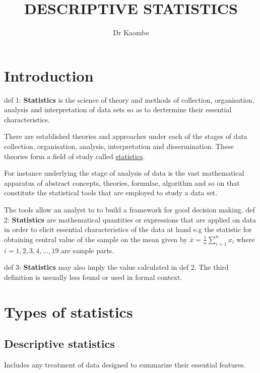 \documentclass[12pt]{article}
\title{DESCRIPTIVE STATISTICS}
\author{Dr Kaombe}
\begin{document}
%
\maketitle
\newpage
\tableofcontents

\newpage

\section{Introduction}
\setlength{\parskip}{0.5em} %
def 1: \textbf{Statistics} is the science of theory and methods of collection, organisation, analysis and interpretation of data sets so as to dertermine their essential characteristics.

There are established theories and approaches under each of the stages of data collection, organisation, analysis, interpretation and dissermination. These theories form a field of study called \underline{statistics}.

For instance underlying the stage of analysis of data is the vast mathematical apparatus of abstract concepts, theories, formulae, algorithm and so on that constitute the statistical tools that are employed to study a data set.

The tools allow an analyst to to build a framework for good decision making.
\newline
def 2: \textbf{Statistics} are mathematical quantities or expressions that are applied on data in order to elicit essential characteristics of the data at hand e.g the statistic for obtaining central value of the sample on the mean given by $\bar{x} = \frac{1}{n}\sum_{i = 1}^{n} x_i$ where $i = 1,2,3,4, \dots,19$ are sample parts.

def 3: \textbf{Statistics} may also imply the value calculated in def 2.
The third definition is ussually less found or used in formal context.


\section{Types of statistics}
\subsection{Descriptive statistics}
Includes any treatment of data designed to summarize their essential features.
\end{document}
